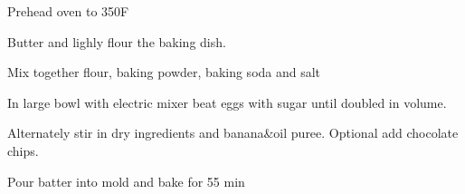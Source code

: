 Prehead oven to 350\degree F

Butter and lighly flour the baking dish.

Mix together flour, baking powder, baking soda and salt

In large bowl with electric mixer beat eggs with sugar until doubled in volume. 

Alternately stir in dry ingredients and banana\&oil puree. Optional add chocolate chips. 

Pour batter into mold and bake for 55 min 
